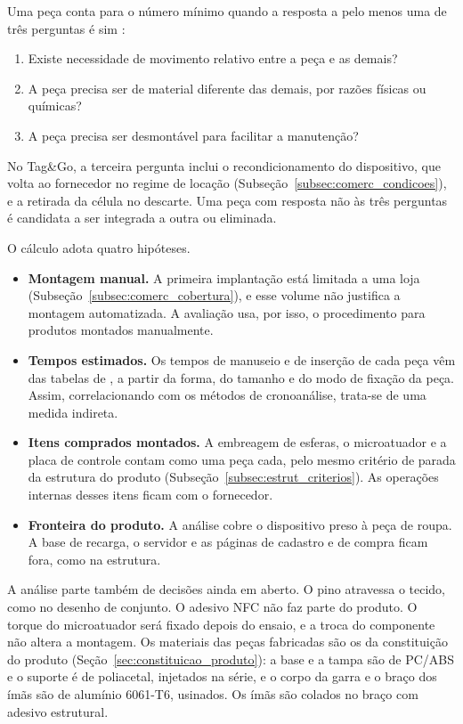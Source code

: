 Uma peça conta para o número mínimo quando a resposta a pelo menos uma de três perguntas é sim \cite{rozenfeld2006gestao}:

\begin{enumerate}
    \item Existe necessidade de movimento relativo entre a peça e as demais?
    \item A peça precisa ser de material diferente das demais, por razões físicas ou químicas?
    \item A peça precisa ser desmontável para facilitar a manutenção?
\end{enumerate}

No Tag\&Go, a terceira pergunta inclui o recondicionamento do dispositivo, que volta ao fornecedor no regime de locação (Subseção~\ref{subsec:comerc_condicoes}), e a retirada da célula no descarte. Uma peça com resposta não às três perguntas é candidata a ser integrada a outra ou eliminada.

O cálculo adota quatro hipóteses.

\begin{itemize}
    \item \textbf{Montagem manual.} A primeira implantação está limitada a uma loja (Subseção~\ref{subsec:comerc_cobertura}), e esse volume não justifica a montagem automatizada. A avaliação usa, por isso, o procedimento para produtos montados manualmente.
    \item \textbf{Tempos estimados.} Os tempos de manuseio e de inserção de cada peça vêm das tabelas de , a partir da forma, do tamanho e do modo de fixação da peça. Assim, correlacionando com os métodos de cronoanálise, trata-se de uma medida indireta.
    \item \textbf{Itens comprados montados.} A embreagem de esferas, o microatuador e a placa de controle contam como uma peça cada, pelo mesmo critério de parada da estrutura do produto (Subseção~\ref{subsec:estrut_criterios}). As operações internas desses itens ficam com o fornecedor.
    \item \textbf{Fronteira do produto.} A análise cobre o dispositivo preso à peça de roupa. A base de recarga, o servidor e as páginas de cadastro e de compra ficam fora, como na estrutura.
\end{itemize}

A análise parte também de decisões ainda em aberto. O pino atravessa o tecido, como no desenho de conjunto. O adesivo NFC não faz parte do produto. O torque do microatuador será fixado depois do ensaio, e a troca do componente não altera a montagem. Os materiais das peças fabricadas são os da constituição do produto (Seção~\ref{sec:constituicao_produto}): a base e a tampa são de PC/ABS e o suporte é de poliacetal, injetados na série, e o corpo da garra e o braço dos ímãs são de alumínio 6061-T6, usinados. Os ímãs são colados no braço com adesivo estrutural.

